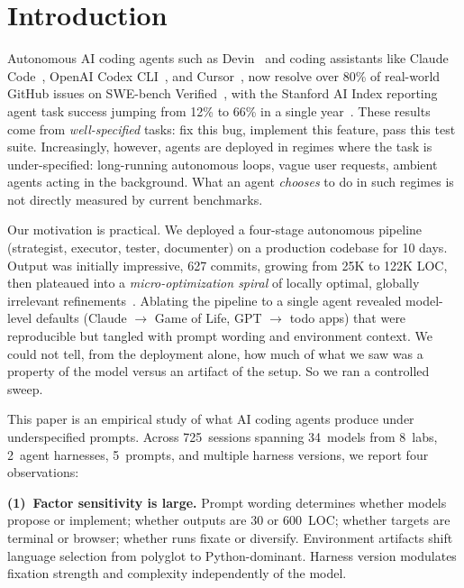 \documentclass{article}
\begin{document}
\section{Introduction}
\label{sec:intro}

Autonomous AI coding agents such as
Devin~\citep{cognition2024devin} and coding assistants like Claude
Code~\citep{anthropic2025claudecode}, OpenAI Codex
CLI~\citep{openai2025codex}, and
Cursor~\citep{cursor2024}, now resolve over 80\% of real-world
GitHub issues on SWE-bench
Verified~\citep{swebenchpro2026,jimenez2024swebench,yang2024sweagent},
with the Stanford AI Index reporting agent task success jumping
from 12\% to 66\% in a single year~\citep{stanforhai2026index}.
These results come from \emph{well-specified} tasks: fix this
bug, implement this feature, pass this test suite. Increasingly,
however, agents are deployed in regimes where the task is
under-specified: long-running autonomous loops, vague user
requests, ambient agents acting in the background. What an agent
\emph{chooses} to do in such regimes is not directly measured by
current benchmarks.

Our motivation is practical. We deployed a four-stage autonomous
pipeline (strategist, executor, tester, documenter) on a
production codebase for 10 days. Output was initially
impressive, 627 commits, growing from 25K to 122K LOC, then
plateaued into a \emph{micro-optimization spiral} of locally
optimal, globally irrelevant
refinements~\citep{christensen1997,simon1956}. Ablating the
pipeline to a single agent revealed model-level defaults
(Claude $\to$ Game of Life, GPT $\to$ todo apps) that were
reproducible but tangled with prompt wording and environment
context. We could not tell, from the deployment alone, how much
of what we saw was a property of the model versus an artifact of
the setup. So we ran a controlled sweep.

This paper is an empirical study of what AI coding agents
produce under underspecified prompts. Across 725~sessions
spanning 34~models from 8~labs, 2~agent harnesses, 5~prompts, and
multiple harness versions, we report four observations:

\textbf{(1)~Factor sensitivity is large.} Prompt wording
determines whether models propose or implement; whether outputs
are 30 or 600~LOC; whether targets are terminal or browser;
whether runs fixate or diversify. Environment artifacts shift
language selection from polyglot to Python-dominant. Harness
version modulates fixation strength and complexity
independently of the model.
\end{document}
